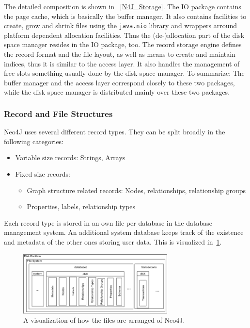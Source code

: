         The detailed composition is shown in ~\ref{N4J_Storage}.
        The IO package contains the page cache, which is basically the buffer manager.
        It also contains facilities to create, grow and shrink files using the \texttt{java.nio} library and wrappers arround platform dependent allocation facilities.
        Thus the (de-)allocation part of the disk space manager resides in the IO package, too.
        The record storage engine defines the record format and the file layout, as well as means to create and maintain indices, thus it is similar to the access layer. 
        It also handles the management of free slots something usually done by the disk space manager.
        To summarize: The buffer manager and the access layer correspond closely to these two packages, while the disk space manager is distributed mainly over these two packages.        

        \subsubsection*{Record and File Structures}
        Neo4J uses several different record types. They can be split broadly in the following categories:
        \begin{itemize}
         \item Variable size records: Strings, Arrays
         \item Fixed size records:
         \begin{itemize}
          \item Graph structure related records: Nodes, relationships, relationship groups
          \item Properties, labels, relationship types
         \end{itemize}
        \end{itemize}
        
        Each record type is stored in an own file per database in the database management system.
        An additional system database keeps track of the existence and metadata of the other ones storing user data.
        This is visualized in~\ref{n4j-disk}.
        \begin{figure}[htp]
            \begin{center}
                \includegraphics[keepaspectratio,height=0.4\textheight,width=0.7\textwidth]{img/03-preliminaries/N4J_disk_view.png}
            \end{center}
            \caption{A visualization of how the files are arranged of Neo4J.}
            \label{n4j-disk}
        \end{figure}
        
